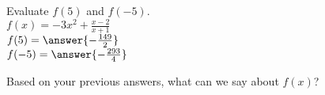 \documentclass{ximera}
\author{David Kish}
\begin{document}
\begin{exercise}
Evaluate $f(5)$ and $f(-5)$.\\
$f(x)= -3x^2+ \frac{x-2}{x+1}$\\
$f(5)=\answer{-\frac{149}{2}}$\\
$f(-5)=\answer{-\frac{293}{4}}$
\end{exercise}
\begin{exercise}
Based on your previous answers, what can we say about $f(x)$?
\begin{multipleChoice}
\end{multipleChoice}
\end{exercise}
\end{document}
